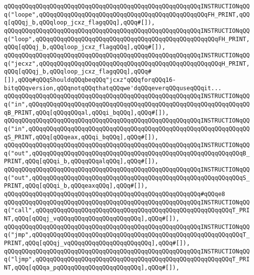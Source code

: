 \verb|qQQqqQQqqQQqqQQqqQQqqQQqqQQqqQQqqQQqqQQqqQQqqQQqqQQqqQQqINSTRUCTIONqQQq("loope",qQQqqQQqqQQqqQQqqQQqqQQqqQQqqQQqqQQqqQQqqQQqqQQqFH_PRINT,qQQq[qQQqj_b,qQQqloop_jcxz_flagqQQq],qQQq#[]),|\newline
\verb|qQQqqQQqqQQqqQQqqQQqqQQqqQQqqQQqqQQqqQQqqQQqqQQqqQQqqQQqINSTRUCTIONqQQq("loop",qQQqqQQqqQQqqQQqqQQqqQQqqQQqqQQqqQQqqQQqqQQqqQQqqQQqFH_PRINT,qQQq[qQQqj_b,qQQqloop_jcxz_flagqQQq],qQQq#[]),|\newline
\verb|qQQqqQQqqQQqqQQqqQQqqQQqqQQqqQQqqQQqqQQqqQQqqQQqqQQqqQQqINSTRUCTIONqQQq("jecxz",qQQqqQQqqQQqqQQqqQQqqQQqqQQqqQQqqQQqqQQqqQQqqQQqqQQqH_PRINT,qQQq[qQQqj_b,qQQqloop_jcxz_flagqQQq],qQQq#[]),qQQq#qQQqShouldqQQqbeqQQq"jcxz"qQQqforqQQq16-bitqQQqversion,qQQqnotqQQqthatqQQqwe'dqQQqeverqQQquseqQQqit...|\newline
\verb|qQQqqQQqqQQqqQQqqQQqqQQqqQQqqQQqqQQqqQQqqQQqqQQqqQQqqQQqINSTRUCTIONqQQq("in",qQQqqQQqqQQqqQQqqQQqqQQqqQQqqQQqqQQqqQQqqQQqqQQqqQQqqQQqqQQqqQQqB_PRINT,qQQq[qQQqqQQqal,qQQqi_bqQQq],qQQq#[]),|\newline
\verb|qQQqqQQqqQQqqQQqqQQqqQQqqQQqqQQqqQQqqQQqqQQqqQQqqQQqqQQqINSTRUCTIONqQQq("in",qQQqqQQqqQQqqQQqqQQqqQQqqQQqqQQqqQQqqQQqqQQqqQQqqQQqqQQqqQQqqQQqS_PRINT,qQQq[qQQqeax,qQQqi_bqQQq],qQQq#[]),|\newline
\verb|qQQqqQQqqQQqqQQqqQQqqQQqqQQqqQQqqQQqqQQqqQQqqQQqqQQqqQQqINSTRUCTIONqQQq("out",qQQqqQQqqQQqqQQqqQQqqQQqqQQqqQQqqQQqqQQqqQQqqQQqqQQqqQQqqQQqB_PRINT,qQQq[qQQqi_b,qQQqqQQqalqQQq],qQQq#[]),|\newline
\verb|qQQqqQQqqQQqqQQqqQQqqQQqqQQqqQQqqQQqqQQqqQQqqQQqqQQqqQQqINSTRUCTIONqQQq("out",qQQqqQQqqQQqqQQqqQQqqQQqqQQqqQQqqQQqqQQqqQQqqQQqqQQqqQQqqQQqS_PRINT,qQQq[qQQqi_b,qQQqeaxqQQq],qQQq#[]),|\newline
\verb|qQQqqQQqqQQqqQQqqQQqqQQqqQQqqQQqqQQqqQQqqQQqqQQqqQQqqQQq#qQQqe8|\newline
\verb|qQQqqQQqqQQqqQQqqQQqqQQqqQQqqQQqqQQqqQQqqQQqqQQqqQQqqQQqINSTRUCTIONqQQq("call",qQQqqQQqqQQqqQQqqQQqqQQqqQQqqQQqqQQqqQQqqQQqqQQqqQQqqQQqT_PRINT,qQQq[qQQqj_vqQQqqQQqqQQqqQQqqQQqqQQq],qQQq#[]),|\newline
\verb|qQQqqQQqqQQqqQQqqQQqqQQqqQQqqQQqqQQqqQQqqQQqqQQqqQQqqQQqINSTRUCTIONqQQq("jmp",qQQqqQQqqQQqqQQqqQQqqQQqqQQqqQQqqQQqqQQqqQQqqQQqqQQqqQQqqQQqT_PRINT,qQQq[qQQqj_vqQQqqQQqqQQqqQQqqQQqqQQq],qQQq#[]),|\newline
\verb|qQQqqQQqqQQqqQQqqQQqqQQqqQQqqQQqqQQqqQQqqQQqqQQqqQQqqQQqINSTRUCTIONqQQq("ljmp",qQQqqQQqqQQqqQQqqQQqqQQqqQQqqQQqqQQqqQQqqQQqqQQqqQQqqQQqT_PRINT,qQQq[qQQqa_pqQQqqQQqqQQqqQQqqQQqqQQq],qQQq#[]),|\newline
